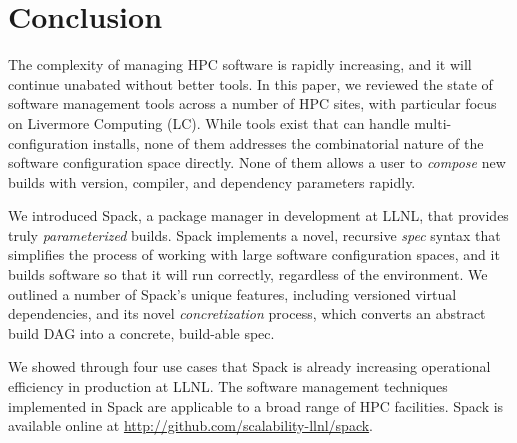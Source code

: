 
\section{Conclusion}
\label{sec:conclusion}


The complexity of managing HPC software is rapidly increasing, and it
will continue unabated without better tools.
In this paper, we reviewed the state of software management tools
across a number of HPC sites, with particular focus on Livermore
Computing (LC). While tools exist that can handle multi-configuration
installs, none of them addresses the combinatorial nature
of the software configuration space directly. None of them allows
a user to {\it compose} new builds with version, compiler,
and dependency parameters rapidly.

We introduced Spack, a package manager in development at LLNL, that
provides truly {\it parameterized} builds.  Spack implements
a novel, recursive {\it spec} syntax that simplifies the process of working
with large software configuration spaces, and it builds software
so that it will run correctly, regardless of the environment.
We outlined a number of Spack's unique features, including
versioned virtual dependencies, and its novel {\it concretization}
process, which converts an abstract build DAG into a concrete,
build-able spec.

We showed through four use cases that Spack is already increasing
operational efficiency in production at LLNL. The
software management techniques implemented in Spack are applicable
to a broad range of HPC facilities.
Spack is available online at \url{http://github.com/scalability-llnl/spack}.

